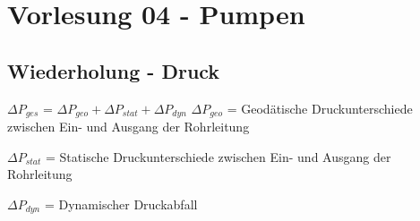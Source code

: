 \documentclass[a4paper,10pt,twoside]{article}
\begin{document}
\pagebreak

\section*{Vorlesung 04 - Pumpen}
\addtocounter{section}{1}
\subsection{Wiederholung - Druck}
$\Delta P_{ges}$ = $\Delta P_{geo} + \Delta P_{stat} + \Delta P_{dyn}$ \pp
$\Delta P_{geo}$ = Geodätische Druckunterschiede zwischen Ein- und Ausgang der Rohrleitung \par 
$\Delta P_{stat}$ = Statische Druckunterschiede zwischen Ein- und Ausgang der Rohrleitung \par 
$\Delta P_{dyn}$ = Dynamischer Druckabfall
\end{document}
